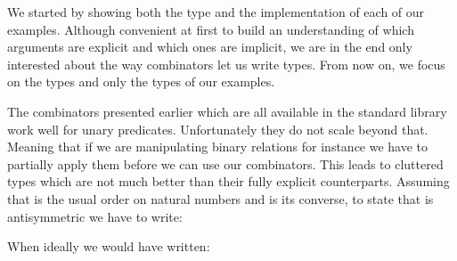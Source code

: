 We started by showing both the type and the implementation of each of our
examples. Although convenient at first to build an understanding of which
arguments are explicit and which ones are implicit, we are in the end only
interested about the way combinators let us write types. From now on, we
focus on the types and only the types of our examples.

The combinators presented earlier which are all available in the standard
library work well for unary predicates. Unfortunately they do not scale
beyond that. Meaning that if we are manipulating binary relations for
instance we have to partially apply them before we can use our combinators.
This leads to cluttered types which are not much better than their fully
explicit counterparts. Assuming that  is the usual order on natural
numbers and  is its converse, to state that  is antisymmetric
we have to write:


When ideally we would have written:

